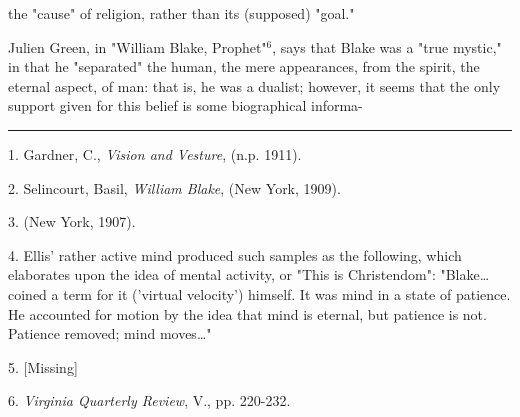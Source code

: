 the "cause" of religion, rather than its (supposed) "goal."\par
\vspace*{0.5\baselineskip}
Julien Green, in "William Blake, Prophet"$^{6}$, says that 
Blake was a "true mystic," in that he "separated" the human,
the mere appearances, from the spirit, the eternal aspect, of man:
that is, he was a dualist; however, it seems that the only support given for this belief is some 
biographical informa-\linebreak
\null\par
\vspace*{-\baselineskip}
\vspace*{\fill}
\noindent\rule{0.25\textwidth}{0.4pt}\par
1. Gardner, C., \textit{Vision and Vesture}, (n.p. 1911).\par
2. Selincourt, Basil, \textit{William Blake}, (New York, 1909).\par
3. (New York, 1907).\par
4. Ellis' rather active mind produced such samples as the following, which elaborates upon
the idea of mental activity, or "This is Christendom": "Blake\dots coined a term for it
('virtual velocity') himself. It was mind in a state of patience. He accounted for motion by the idea that
mind is eternal, but patience is not. Patience removed; mind moves\dots"\par
5. [Missing]\par
6. \textit{Virginia Quarterly Review}, V., pp. 220-232.\par

\newpage


